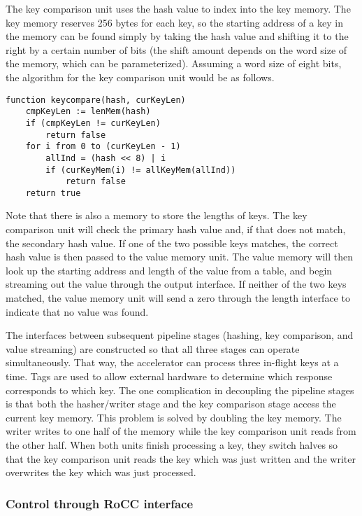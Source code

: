 The key comparison unit uses the hash value to index into the key memory.
The key memory reserves 256 bytes for each key, so the starting address of a
key in the memory can be found simply by taking the hash value and shifting it
to the right by a certain number of bits (the shift amount depends on the
word size of the memory, which can be parameterized). Assuming a word size
of eight bits, the algorithm for the key comparison unit would be as follows.

{\footnotesize
\begin{verbatim}
function keycompare(hash, curKeyLen)
    cmpKeyLen := lenMem(hash)
    if (cmpKeyLen != curKeyLen)
        return false
    for i from 0 to (curKeyLen - 1)
        allInd = (hash << 8) | i
        if (curKeyMem(i) != allKeyMem(allInd))
            return false
    return true
\end{verbatim}
}

Note that there is also a memory to store the lengths of keys.
The key comparison unit will check the primary hash value and, if that does
not match, the secondary hash value. If one of the two possible keys matches,
the correct hash value is then passed to the value memory unit. The value
memory will then look up the starting address and length of the value from a
table, and begin streaming out the value through the output interface.
If neither of the two keys matched, the value memory unit will send
a zero through the length interface to indicate that no value was found.

The interfaces between subsequent pipeline stages (hashing, key comparison,
and value streaming) are constructed so that all three stages can operate
simultaneously. That way, the accelerator can process three in-flight keys
at a time. Tags are used to allow external hardware to determine which
response corresponds to which key. The one complication in decoupling the
pipeline stages is that both the hasher/writer stage and the key comparison
stage access the current key memory. This problem is solved by doubling the
key memory. The writer writes to one half of the memory while the key
comparison unit reads from the other half. When both units finish processing
a key, they switch halves so that the key comparison unit reads the key which
was just written and the writer overwrites the key which was just processed.

\subsubsection{Control through RoCC interface}

